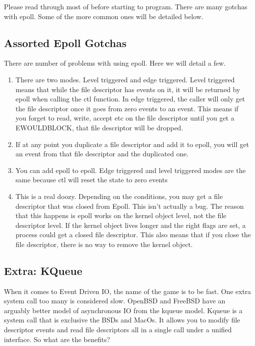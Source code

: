 Please read through most of  before starting to program. There are many gotchas with epoll. Some of the more common ones will be detailed below.

\subsection{Assorted Epoll Gotchas}

There are number of problems with using epoll. Here we will detail a few.

\begin{enumerate}
\item There are two modes. Level triggered and edge triggered. Level triggered means that while the file descriptor has events on it, it will be returned by epoll when calling the ctl function. In edge triggered, the caller will only get the file descriptor once it goes from zero events to an event.
  This means if you forget to read, write, accept etc on the file descriptor until you get a EWOULDBLOCK, that file descriptor will be dropped.
\item If at any point you duplicate a file descriptor and add it to epoll, you will get an event from that file descriptor and the duplicated one.
\item You can add epoll to epoll. Edge triggered and level triggered modes are the same because ctl will reset the state to zero events
\item This is a real doozy. Depending on the conditions, you may get a file descriptor that was closed from Epoll. This isn't actually a bug. The reason that this happens is epoll works on the kernel object level, not the file descriptor level.
  If the kernel object lives longer and the right flags are set, a process could get a closed file descriptor.
  This also means that if you close the file descriptor, there is no way to remove the kernel object.
\end{enumerate}


\subsection{Extra: KQueue}

When it comes to Event Driven IO, the name of the game is to be fast.
One extra system call too many is considered slow.
OpenBSD and FreeBSD have an arguably better model of asynchronous IO from the kqueue model.
Kqueue is a system call that is exclusive the BSDs and MacOs.
It allows you to modify file descriptor events and read file descriptors all in a single call under a unified interface.
So what are the benefits?


